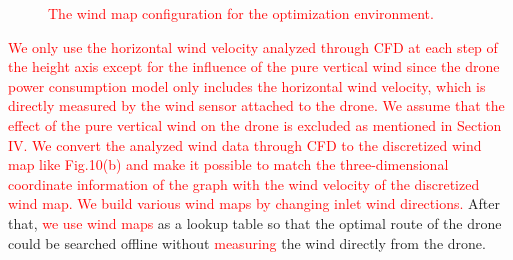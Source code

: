 \documentclass[journal]{./template/IEEEtran}
\begin{document}
\begin{figure}[ht]
\centering
{}
\caption{\textcolor{red}{The wind map configuration for the optimization environment.}}
\label{fig: wind_map}
\end{figure}

\noindent\textcolor{red}{
We only use the horizontal wind velocity analyzed through CFD at each step of the height axis except for the influence of the pure vertical wind since the drone power consumption model only includes the horizontal wind velocity, which is directly measured by the wind sensor attached to the drone. 
We assume that the effect of the pure vertical wind on the drone is excluded as mentioned in Section IV.
We convert the analyzed wind data through CFD to the discretized wind map like Fig.10(b) and make it possible to match the three-dimensional coordinate information of the graph with the wind velocity of the discretized wind map.
We build various wind maps by changing inlet wind directions.}
After that, \textcolor{red}{we use wind maps} as a lookup table so that the optimal route of the drone could be searched offline without \textcolor{red}{measuring} the wind directly from the drone.
\end{document}
